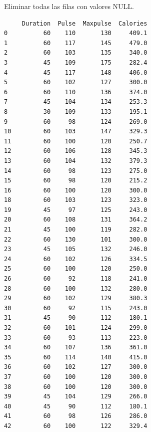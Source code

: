 \begin{code} Eliminar todas las filas con valores NULL.

\begin{Shaded}
\begin{Highlighting}[]

\OperatorTok{=}\NormalTok{)}

\OperatorTok{=} \NormalTok{)}

\end{Highlighting}
\end{Shaded}

\begin{verbatim}
     Duration  Pulse  Maxpulse  Calories
0          60    110       130     409.1
1          60    117       145     479.0
2          60    103       135     340.0
3          45    109       175     282.4
4          45    117       148     406.0
5          60    102       127     300.0
6          60    110       136     374.0
7          45    104       134     253.3
8          30    109       133     195.1
9          60     98       124     269.0
10         60    103       147     329.3
11         60    100       120     250.7
12         60    106       128     345.3
13         60    104       132     379.3
14         60     98       123     275.0
15         60     98       120     215.2
16         60    100       120     300.0
18         60    103       123     323.0
19         45     97       125     243.0
20         60    108       131     364.2
21         45    100       119     282.0
22         60    130       101     300.0
23         45    105       132     246.0
24         60    102       126     334.5
25         60    100       120     250.0
26         60     92       118     241.0
28         60    100       132     280.0
29         60    102       129     380.3
30         60     92       115     243.0
31         45     90       112     180.1
32         60    101       124     299.0
33         60     93       113     223.0
34         60    107       136     361.0
35         60    114       140     415.0
36         60    102       127     300.0
37         60    100       120     300.0
38         60    100       120     300.0
39         45    104       129     266.0
40         45     90       112     180.1
41         60     98       126     286.0
42         60    100       122     329.4

\end{verbatim}
\end{code}
